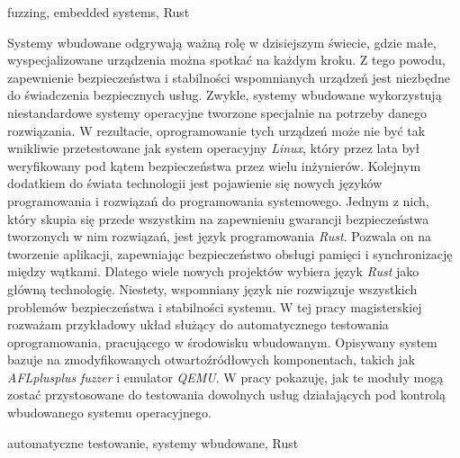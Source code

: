\documentclass[
    bindingoffset=5mm,  %
    footnoteindent=3mm, %
    hyphenation=true    %
]{src/wut-thesis}
\begin{document}
\keywords fuzzing, embedded systems, Rust

\clearpage
\secondabstract
Systemy wbudowane odgrywają ważną rolę w dzisiejszym świecie, gdzie małe, wyspecjalizowane urządzenia można spotkać na każdym kroku. Z tego powodu, zapewnienie bezpieczeństwa i stabilności wspomnianych urządzeń jest niezbędne do świadczenia bezpiecznych usług. Zwykle, systemy wbudowane wykorzystują niestandardowe systemy operacyjne tworzone specjalnie na potrzeby danego rozwiązania. W rezultacie, oprogramowanie tych urządzeń może nie być tak wnikliwie przetestowane jak system operacyjny \textit{Linux}, który przez lata był weryfikowany pod kątem bezpieczeństwa przez wielu inżynierów. Kolejnym dodatkiem do świata technologii jest pojawienie się nowych języków programowania i rozwiązań do programowania systemowego. Jednym z nich, który skupia się przede wszystkim na zapewnieniu gwarancji bezpieczeństwa tworzonych w nim rozwiązań, jest język programowania \textit{Rust}. Pozwala on na tworzenie aplikacji, zapewniając bezpieczeństwo obsługi pamięci i synchronizację między wątkami. Dlatego wiele nowych projektów wybiera język \textit{Rust} jako główną technologię. Niestety, wspomniany język nie rozwiązuje wszystkich problemów bezpieczeństwa i stabilności systemu. W tej pracy magisterskiej rozważam przykładowy układ służący do automatycznego testowania oprogramowania, pracującego w środowisku wbudowanym. Opisywany system bazuje na zmodyfikowanych otwartoźródłowych komponentach, takich jak \textit{AFLplusplus} \textit{fuzzer} i emulator \textit{QEMU}. W pracy pokazuję, jak te moduły mogą zostać przystosowane do testowania dowolnych usług działających pod kontrolą wbudowanego systemu operacyjnego.

\secondkeywords automatyczne testowanie, systemy wbudowane, Rust

\pagestyle{plain}

\cleardoublepage %
\tableofcontents

\cleardoublepage %
\pagestyle{headings}







\end{document}

